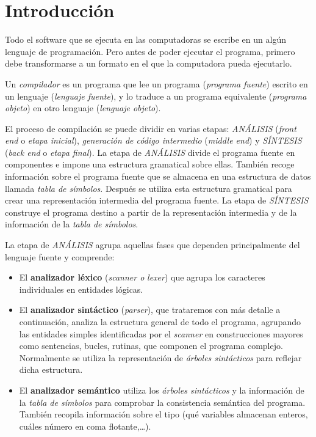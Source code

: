 
\section{Introducción}

Todo el software que se ejecuta en las computadoras se escribe en un algún lenguaje de programación.  Pero antes de poder ejecutar el programa, primero debe transformarse a un formato en el que la computadora pueda ejecutarlo.  

Un \textit{compilador} es un programa que lee  un programa  (\textit{programa fuente}) escrito en un lenguaje (\textit{lenguaje fuente}), y lo traduce a un programa equivalente (\textit{programa objeto})  en otro lenguaje (\textit{lenguaje objeto}).

El proceso de compilación se puede dividir en varias etapas: \textit{ANÁLISIS} (\textit{front end} o \textit{etapa inicial}), \textit{generación de código intermedio} (\textit{middle end})  y \textit{SÍNTESIS} (\textit{back end} o \textit{etapa final}).  La etapa de \textit{ANÁLISIS} divide el programa fuente en componentes e impone una estructura gramatical sobre ellas. También recoge información sobre el programa fuente que se almacena en una estructura de datos llamada \textit{tabla de símbolos}. Después se utiliza esta estructura gramatical para crear una representación intermedia del programa fuente. La etapa de \textit{SÍNTESIS}  construye el programa destino a partir de la representación intermedia y de la información de la \textit{tabla de símbolos}\cite{jimenez2009compiladores}\cite{sintactico}.



La etapa de \textit{ANÁLISIS} agrupa aquellas fases que dependen principalmente del lenguaje fuente y comprende:

\begin{itemize}
	\item El \textbf{analizador léxico} (\textit{scanner o }\emph{lexer}) que agrupa los caracteres individuales en entidades lógicas.
	\item El \textbf{analizador sintáctico} (\textit{parser}), que trataremos con más detalle a continuación, analiza la estructura general de todo el programa, agrupando las entidades simples identificadas por el \textit{scanner} en construcciones mayores como sentencias, bucles, rutinas, que componen el programa complejo. Normalmente se utiliza la representación de \textit{árboles sintácticos} para reflejar dicha estructura.
	\item El \textbf{analizador semántico} utiliza los \textit{árboles sintácticos} y la información de la \textit{tabla de símbolos} para comprobar la consistencia semántica del programa. También recopila información sobre el tipo (qué variables almacenan enteros, cuáles número en coma flotante,\dots{}).
	
\end{itemize}


